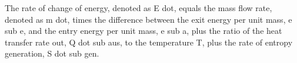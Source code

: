 The rate of change of energy, denoted as E dot, equals the mass flow rate, denoted as m dot, times the difference between the exit energy per unit mass, e sub e, and the entry energy per unit mass, e sub a, plus the ratio of the heat transfer rate out, Q dot sub aus, to the temperature T, plus the rate of entropy generation, S dot sub gen.